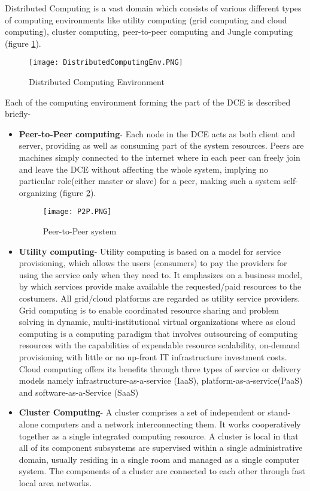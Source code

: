 Distributed Computing is a vast domain which consists of various different types of computing environments like utility computing (grid computing and cloud computing), cluster computing, peer-to-peer computing and Jungle computing (figure \ref{fig:DistributedComputingEnv}). 

\begin{figure}[ht!]
\centering
\texttt{[image: DistributedComputingEnv.PNG]}
\caption{Distributed Computing Environment}
\label{fig:DistributedComputingEnv}
\end{figure}

Each of the computing environment forming the part of the DCE is described briefly-
\begin{itemize}
\item \textbf{Peer-to-Peer computing}- Each node in the DCE acts as both client and server, providing as well as consuming part of the system resources. Peers are machines simply connected to the internet where in each peer can freely join and leave the DCE without affecting the whole system, implying no particular role(either master or slave) for a peer, making such a system self-organizing (figure \ref{fig:P2P}).

\begin{figure}[ht!]
\centering
\texttt{[image: P2P.PNG]}
\caption{Peer-to-Peer system}
\label{fig:P2P}
\end{figure}

\item \textbf{Utility computing}- Utility computing is based on a model for service provisioning, which allows the users (consumers) to pay the providers for using the service only when they need to. It emphasizes on a business model, by which services provide make available the requested/paid resources to the costumers. All grid/cloud platforms are regarded as utility service providers. Grid computing is to enable coordinated resource sharing and problem solving in dynamic, multi-institutional virtual organizations where as cloud computing is a computing paradigm that involves outsourcing of computing resources with the capabilities of expendable resource scalability, on-demand provisioning with little or no up-front IT infrastructure investment costs. Cloud computing offers its benefits through
three types of service or delivery models namely infrastructure-as-a-service (IaaS), platform-as-a-service(PaaS) and software-as-a-Service (SaaS) 

\item \textbf{Cluster Computing}- A cluster comprises a set of independent or stand-alone computers and a network interconnecting them. It
works cooperatively together as a single integrated computing resource. A cluster is local in that all of its component subsystems are supervised within a single administrative domain, usually residing in a single room and managed as a single computer system. The components of a cluster are connected to each other through fast local area networks. 


\end{itemize}
